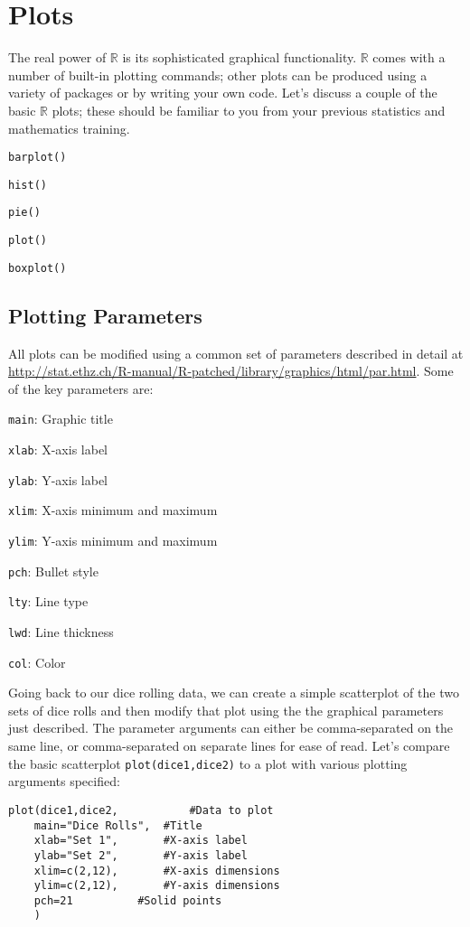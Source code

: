 \documentclass[12pt]{article}
\begin{document}
\section{Plots}\label{sec:plots}
The real power of $\mathbb{R}$ is its sophisticated graphical functionality. $\mathbb{R}$ comes with a number of built-in plotting commands; other plots can be produced using a variety of packages or by writing your own code. Let's discuss a couple of the basic $\mathbb{R}$ plots; these should be familiar to you from your previous statistics and mathematics training.
\begin{itemize*}
\item \verb|barplot()|
\item \verb|hist()|
\item \verb|pie()|
\item \verb|plot()|
\item \verb|boxplot()|
\end{itemize*}

\subsection{Plotting Parameters}
All plots can be modified using a common set of parameters described in detail at \url{http://stat.ethz.ch/R-manual/R-patched/library/graphics/html/par.html}. Some of the key parameters are:
\begin{itemize*}
\item \verb|main|: Graphic title
\item \verb|xlab|: X-axis label
\item \verb|ylab|: Y-axis label
\item \verb|xlim|: X-axis minimum and maximum
\item \verb|ylim|: Y-axis minimum and maximum
\item \verb|pch|: Bullet style
\item \verb|lty|: Line type
\item \verb|lwd|: Line thickness
\item \verb|col|: Color
\end{itemize*}

Going back to our dice rolling data, we can create a simple scatterplot of the two sets of dice rolls and then modify that plot using the the graphical parameters just described. The parameter arguments can either be comma-separated on the same line, or comma-separated on separate lines for ease of read. Let's compare the basic scatterplot \verb|plot(dice1,dice2)| to a plot with various plotting arguments specified:
\begin{verbatim}
plot(dice1,dice2,			#Data to plot
	main="Dice Rolls",	#Title
	xlab="Set 1",		#X-axis label
	ylab="Set 2",		#Y-axis label
	xlim=c(2,12),		#X-axis dimensions
	ylim=c(2,12),		#Y-axis dimensions
	pch=21			#Solid points
	)
\end{verbatim}
\end{document}
